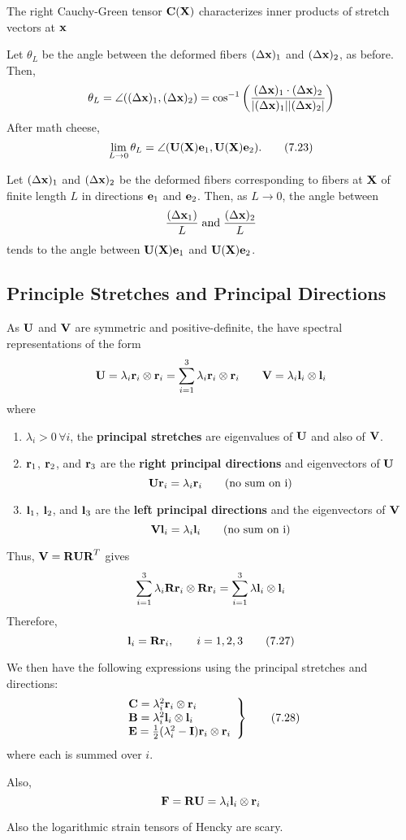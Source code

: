 \documentclass{article}
\begin{document}
\begin{remark}
	The right Cauchy-Green tensor $\textbf{C}(\textbf{X})$ characterizes inner products of stretch vectors at $\textbf{x}$
\end{remark}

Let $\theta_L$ be the angle between the deformed fibers $(\Delta\textbf{x})_1$ and $(\Delta\textbf{x})_2$, as before.
Then,
\[
	\theta_L = \angle((\Delta\textbf{x})_1,(\Delta\textbf{x})_2) = \cos^{-1}\left( \frac{(\Delta\textbf{x})_1 \cdot (\Delta\textbf{x})_2}{|(\Delta\textbf{x})_1||(\Delta\textbf{x})_2|} \right)
\]
After math cheese,
\[
	\lim\limits_{L\to 0}\theta_L = \angle(\textbf{U}(\textbf{X})\textbf{e}_1, \textbf{U}(\textbf{X})\textbf{e}_2). \tag{7.23}\label{eq:7.23}
\]

\begin{remark}
	Let $(\Delta\textbf{x})_1$ and $(\Delta\textbf{x})_2$ be the deformed fibers corresponding to fibers at $\textbf{X}$ of finite length $L$ in directions $\textbf{e}_1$ and $\textbf{e}_2$. Then, as $L\to 0$, the angle between
	$$\frac{(\Delta\textbf{x}_1)}{L} \; \text{and} \; \frac{(\Delta\textbf{x})_2}{L}$$
	tends to the angle between $\textbf{U}(\textbf{X})\textbf{e}_1$ and $\textbf{U}(\textbf{X})\textbf{e}_2$.
\end{remark}

\subsection{Principle Stretches and Principal Directions}
As $\textbf{U}$ and $\textbf{V}$ are symmetric and positive-definite, the have spectral representations of the form
\[
	\textbf{U} = \lambda_i\textbf{r}_i \otimes\textbf{r}_i = \sum_{i=1}^{3}\lambda_i\textbf{r}_i\otimes\textbf{r}_i \qquad
	\textbf{V} =  \lambda_i\textbf{l}_i\otimes\textbf{l}_i
\]
where
\begin{enumerate}
	\item $\lambda_i > 0 \, \forall i$, the \textbf{principal stretches} are eigenvalues of $\textbf{U}$ and also of $\textbf{V}$.
	\item $\textbf{r}_1$, $\textbf{r}_2$, and $\textbf{r}_3$ are the \textbf{right principal directions} and eigenvectors of $\textbf{U}$
	$$\textbf{U}\textbf{r}_i = \lambda_i\textbf{r}_i \qquad \text{(no sum on i)}$$
	\item $\textbf{l}_1$, $\textbf{l}_2$, and $\textbf{l}_3$ are the \textbf{left principal directions} and the eigenvectors of $\textbf{V}$
	$$\textbf{V}\textbf{l}_i = \lambda_i\textbf{l}_i \qquad \text{(no sum on i)}$$
\end{enumerate}

Thus, $\textbf{V} = \textbf{R}\textbf{U}\textbf{R}^T$ gives
\[
	\sum_{i=1}^{3}\lambda_i\textbf{R}\textbf{r}_i\otimes\textbf{R}\textbf{r}_i = \sum_{i=1}^{3}\lambda\textbf{l}_i\otimes\textbf{l}_i
\]
Therefore,
\[
	\textbf{l}_i = \textbf{R}\textbf{r}_i, \qquad i =1,2,3\tag{7.27}\label{eq:7.27}
\]

We then have the following expressions using the principal stretches and directions:
\[
	\left.
	\begin{array}{l}
	\textbf{C} = \lambda_i^2\textbf{r}_i\otimes\textbf{r}_i\\
	\textbf{B} = \lambda_i^2\textbf{l}_i\otimes\textbf{l}_i\\
	\textbf{E} = \frac{1}{2}(\lambda_i^2 - \textbf{I})\textbf{r}_i\otimes\textbf{r}_i
	\end{array}
	\right\rbrace\tag{7.28}\label{eq:7.28}
\]
where each is summed over $i$.

Also,
\[
	\textbf{F} = \textbf{R}\textbf{U} = \lambda_i\textbf{l}_i\otimes\textbf{r}_i 
\]

Also the logarithmic strain tensors of Hencky are scary.
\end{document}
